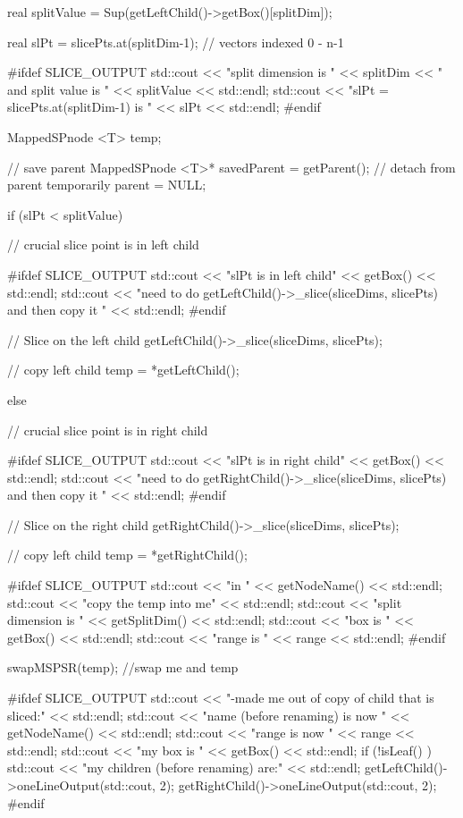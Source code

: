 \begin{DoxyCode}
{{      real splitValue = Sup(getLeftChild()->getBox()[splitDim]);  
      
      real slPt = slicePts.at(splitDim-1); // vectors indexed 0 - n-1
      
      #ifdef SLICE_OUTPUT
        std::cout << "split dimension is " << splitDim << " and split value is 
      " << splitValue << std::endl;
        std::cout << "slPt = slicePts.at(splitDim-1) is " << slPt << std::endl;
      #endif
      
      MappedSPnode <T> temp;
      
      // save parent
      MappedSPnode <T>* savedParent = getParent();
      // detach from parent temporarily
      parent = NULL;
        
      if (slPt < splitValue) { // crucial slice point is in left child
      
        #ifdef SLICE_OUTPUT
          std::cout << "slPt is in left child" << getBox() << std::endl;
          std::cout << "need to do getLeftChild()->_slice(sliceDims, slicePts)
       and then copy it " << std::endl;
        #endif
        
        // Slice on the left child
        getLeftChild()->_slice(sliceDims, slicePts);
        
        // copy left child
        temp = *getLeftChild();
      }
      else { // crucial slice point is in right child
      
        #ifdef SLICE_OUTPUT
          std::cout << "slPt is in right child" << getBox() << std::endl;
          std::cout << "need to do getRightChild()->_slice(sliceDims, slicePts)
       and then copy it " << std::endl;
        #endif
        
        // Slice on the right child
        getRightChild()->_slice(sliceDims, slicePts);
        
        // copy left child
        temp = *getRightChild();
      }
      
      #ifdef SLICE_OUTPUT
        std::cout << "\nback in " << getNodeName() << std::endl;
        std::cout << "\tNow copy the temp into me" << std::endl;
        std::cout << "\tmy split dimension is " << getSplitDim() << std::endl;
        std::cout << "\tmy box is " << getBox() << std::endl;
        std::cout << "\tmy range is " << range << std::endl;
      #endif
      
      swapMSPSR(temp); //swap me and temp
        
      #ifdef SLICE_OUTPUT
        std::cout << "\tre-made me out of copy of child that is sliced:" << 
      std::endl;
        std::cout << "\tmy name (before renaming) is now " << getNodeName() << 
      std::endl;
        std::cout << "\tmy range is now " << range << std::endl;
        std::cout << "\tand my box is " << getBox() << std::endl;
        if (!isLeaf() ) {
          std::cout << "\tand my children (before renaming) are:" << std::endl;
          getLeftChild()->oneLineOutput(std::cout, 2);
          getRightChild()->oneLineOutput(std::cout, 2);
        }
      #endif
      
}}
\end{DoxyCode}
